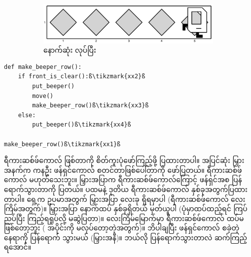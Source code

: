 \begin{figure}[thb!]
    \begin{subfigure}[t]{{\figpctw}\textwidth}
        \includegraphics[scale=0.15]{images/ch04/mrofb/after.jpg}
        \caption{နောက်ဆုံး  လုပ်ပြီး}    
        \label{fig:mrofb_recur6}
    \end{subfigure}
    \caption{}
    \label{fig:mrofb_recur}
\end{figure}


%
\setlength{\fboxsep}{0pt}
\begin{verbatim}
def make_beeper_row():
    if front_is_clear():ß\tikzmark{xx2}ß
        put_beeper()
        move()
        make_beeper_row()ß\tikzmark{xx3}ß
    else:
        put_beeper()ß\tikzmark{xx4}ß

make_beeper_row()ß\tikzmark{xx1}ß
\end{verbatim}
%
%
\btwntikzannoandpar

ရီကားဆစ်ဖ်ကောလ် ဖြစ်တာကို စိတ်ကူးပုံဖော်ကြည့်ဖို့ ပြထားတာပါ။ အပြင်ဆုံး မြှားအနက်က ကန\allowbreak ဦး ဖန်ရှင်ကောလ် စတင်တာဖြစ်‌ပေါ်တာကို ဖော်ပြတယ်။ ရီကားဆစ်ဖ်ကောလ် မဟုတ်သေးဘူး။ မြှားအပြာက ရီကားဆစ်ဖ်ကောလ်ကြောင့် ဖန်ရှင်အစ ပြန်ရောက်သွားတာကို ပြတယ်။ ပထမနဲ့ ဒုတိယ ရီကားဆစ်ဖ်ကောလ် နှစ်ခုအတွက်ပြထားတာပါ။ ရှေ့က ဥပမာအတွက် မြှားအပြာ လေးခု ရှိရမှာပါ (ရီကားဆစ်ဖ်ကောလ် လေးကြိမ်အတွက်)။  မြှားအပြာ နောက်ထပ် နှစ်ခုရှိတယ် မှတ်ယူပါ (ပုံမှာထပ်ထည့်ရင် ကြပ်ညပ်ပြီး ကြည့်ရရှုပ်လို့ မဆွဲပြတာ)။ လေးကြိမ်မြောက်မှာ ရီကားဆစ်ဖ်ကောလ် ထပ်မဖြစ်တော့ဘူး ( အပိုင်းကို မလုပ်တော့တဲ့အတွက်)။ ဘိပါချပြီး ဖန်ရှင်ကောလ် စခဲ့တဲ့နေရာကို ပြန်ရောက် သွားမယ် (မြှားအနီ)။ ဘယ်လို ပြန်ရောက်သွားတာလဲ ဆက်ကြည့်ရအောင်။

